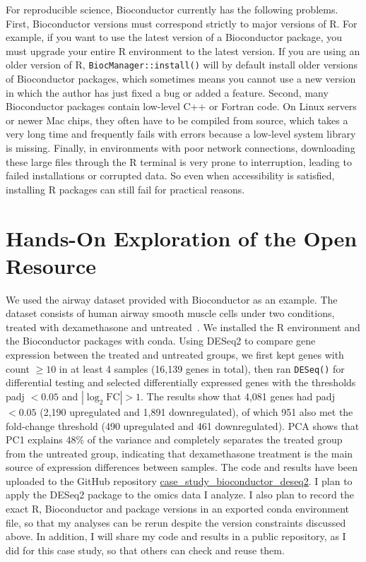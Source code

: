 \documentclass{article}
\begin{document}
For reproducible science, Bioconductor currently has the following problems. First, Bioconductor versions must correspond strictly to major versions of R. For example, if you want to use the latest version of a Bioconductor package, you must upgrade your entire R environment to the latest version. If you are using an older version of R, \texttt{BiocManager::install()} will by default install older versions of Bioconductor packages, which sometimes means you cannot use a new version in which the author has just fixed a bug or added a feature. Second, many Bioconductor packages contain low-level C++ or Fortran code. On Linux servers or newer Mac chips, they often have to be compiled from source, which takes a very long time and frequently fails with errors because a low-level system library is missing. Finally, in environments with poor network connections, downloading these large files through the R terminal is very prone to interruption, leading to failed installations or corrupted data. So even when accessibility is satisfied, installing R packages can still fail for practical reasons.

\section{Hands-On Exploration of the Open Resource}

We used the airway dataset provided with Bioconductor as an example. The dataset consists of human airway smooth muscle cells under two conditions, treated with dexamethasone and untreated~\cite{himes2014}. We installed the R environment and the Bioconductor packages with conda. Using DESeq2 to compare gene expression between the treated and untreated groups, we first kept genes with count $\geq 10$ in at least 4 samples (16,139 genes in total), then ran \texttt{DESeq()} for differential testing and selected differentially expressed genes with the thresholds padj $< 0.05$ and $|\log_2\mathrm{FC}| > 1$. The results show that 4,081 genes had padj $< 0.05$ (2,190 upregulated and 1,891 downregulated), of which 951 also met the fold-change threshold (490 upregulated and 461 downregulated). PCA shows that PC1 explains 48\% of the variance and completely separates the treated group from the untreated group, indicating that dexamethasone treatment is the main source of expression differences between samples. The code and results have been uploaded to the GitHub repository \href{https://github.com/LFD-byte/case_study_bioconductor_deseq2}{case\_study\_bioconductor\_deseq2}. I plan to apply the DESeq2 package to the omics data I analyze. I also plan to record the exact R, Bioconductor and package versions in an exported conda environment file, so that my analyses can be rerun despite the version constraints discussed above. In addition, I will share my code and results in a public repository, as I did for this case study, so that others can check and reuse them.



\end{document}
